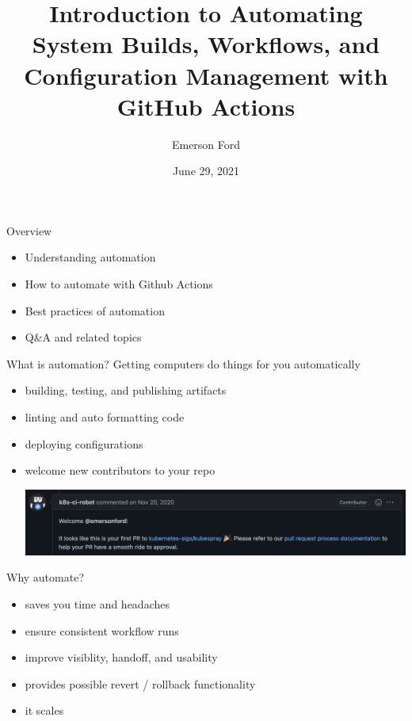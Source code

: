 \documentclass{beamer}
\title{Introduction to Automating System Builds, Workflows, and Configuration Management with GitHub Actions}
\date{June 29, 2021}
\author{Emerson Ford}
\institute{University of Utah --- ITX Meeting}
\begin{document}
\maketitle

\begin{frame}{Overview}
    \begin{itemize}
        \item Understanding automation
        \item How to automate with Github Actions
        \item Best practices of automation
        \item Q\&A and related topics
    \end{itemize}
\end{frame}

\begin{frame}{What is automation?}
    Getting computers do things for you automatically
    \begin{itemize}
        \item building, testing, and publishing artifacts
        \item linting and auto formatting code
        \item deploying configurations
        \item welcome new contributors to your repo \begin{minipage}{\linewidth}\vspace{2pt}\includegraphics[width=0.8\linewidth]{welcome.png}\end{minipage}
    \end{itemize}
\end{frame}

\begin{frame}{Why automate?}
    \begin{itemize}
        \item saves you time and headaches
        \item ensure consistent workflow runs
        \item improve visiblity, handoff, and usability
        \item provides possible revert / rollback functionality
        \item it scales
    \end{itemize}
\end{frame}
\end{document}
